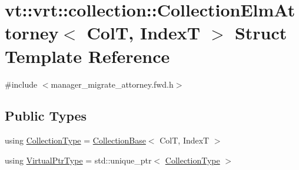 \hypertarget{structvt_1_1vrt_1_1collection_1_1_collection_elm_attorney}{}\section{vt\+:\+:vrt\+:\+:collection\+:\+:Collection\+Elm\+Attorney$<$ ColT, IndexT $>$ Struct Template Reference}
\label{structvt_1_1vrt_1_1collection_1_1_collection_elm_attorney}


{\ttfamily \#include $<$manager\+\_\+migrate\+\_\+attorney.\+fwd.\+h$>$}

\subsection*{Public Types}
\begin{DoxyCompactItemize}
\item 
using \hyperlink{structvt_1_1vrt_1_1collection_1_1_collection_elm_attorney_a72d0076f73ac093f85ba5910337c6d02}{Collection\+Type} = \hyperlink{structvt_1_1vrt_1_1collection_1_1_collection_base}{Collection\+Base}$<$ ColT, IndexT $>$
\item 
using \hyperlink{structvt_1_1vrt_1_1collection_1_1_collection_elm_attorney_a36fe2c7f590baec1038c592db59a6315}{Virtual\+Ptr\+Type} = std\+::unique\+\_\+ptr$<$ \hyperlink{structvt_1_1vrt_1_1collection_1_1_collection_elm_attorney_a72d0076f73ac093f85ba5910337c6d02}{Collection\+Type} $>$
\end{DoxyCompactItemize}
